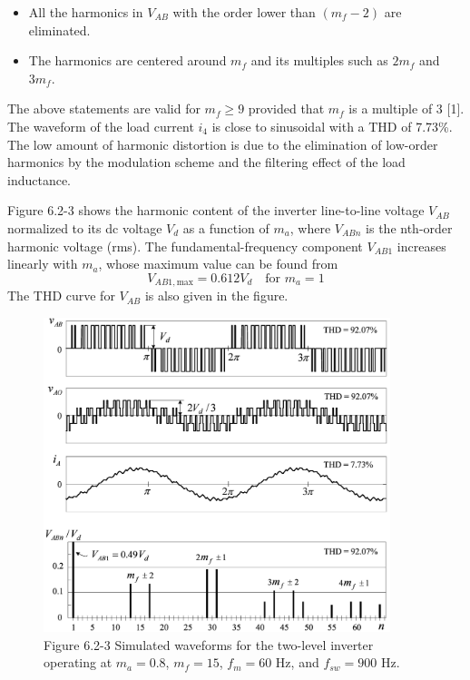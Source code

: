 \documentclass[letterpaper,12pt]{article}
\begin{document}
\begin{itemize}
	\item All the harmonics in $V_{AB}$ with the order lower than $(m_f - 2)$ are eliminated.
	\item The harmonics are centered around $m_f$ and its multiples such as $2m_f$ and $3m_f$.
\end{itemize}

The above statements are valid for $m_f \geq 9$ provided that $m_f$ is a multiple of 3 [1]. The waveform of the load current $i_4$ is close to sinusoidal with a THD of 7.73\%. The low amount of harmonic distortion is due to the elimination of low-order harmonics by the modulation scheme and the filtering effect of the load inductance.

Figure 6.2-3 shows the harmonic content of the inverter line-to-line voltage $V_{AB}$ normalized to its dc voltage $V_d$ as a function of $m_a$, where $V_{ABn}$ is the nth-order harmonic voltage (rms). The fundamental-frequency component $V_{AB1}$ increases linearly with $m_a$, whose maximum value can be found from
\[
	V_{AB1,\text{max}} = 0.612 V_d \quad \text{for } m_a = 1
\]
The THD curve for $V_{AB}$ is also given in the figure.

\begin{figure}[h]
	\centering
	\includegraphics[width=0.9\textwidth]{graficos/img71.jpg}
	\caption{Figure 6.2-3 Simulated waveforms for the two-level inverter operating at $m_a = 0.8$, $m_f = 15$, $f_m = 60$ Hz, and $f_{sw} = 900$ Hz.}
\end{figure}
\FloatBarrier
\end{document}
